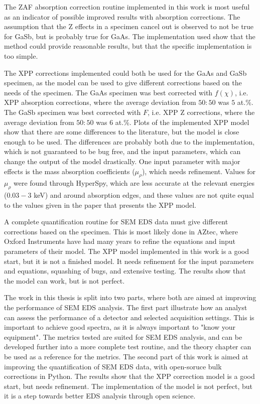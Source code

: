The ZAF absorption correction routine implemented in this work is most useful as an indicator of possible improved results with absorption corrections.
The assumption that the Z effects in a specimen cancel out is observed to not be true for GaSb, but is probably true for GaAs.
The implementation used show that the method could provide reasonable results, but that the specific implementation is too simple.

The XPP corrections implemented could both be used for the GaAs and GaSb specimen, as the model can be used to give different corrections based on the needs of the specimen.
The GaAs specimen was best corrected with $f(\chi)$, i.e. XPP absorption corrections, where the average deviation from $50:50$ was $5$ at.\%.
The GaSb specimen was best corrected with $F$, i.e. XPP Z corrections, where the average deviation from $50:50$ was $6$ at.\%.
Plots of the implemented XPP model show that there are some differences to the literature, but the model is close enough to be used.
The differences are probably both due to the implementation, which is not guaranteed to be bug free, and the input parameters, which can change the output of the model drastically.
One input parameter with major effects is the mass absorption coefficients ($\mu_\rho$), which needs refinement.
Values for $\mu_\rho$ were found through HyperSpy, which are less accurate at the relevant energies ($0.03-3$ keV) and around absorption edges, and these values are not quite equal to the values given in the paper that presents the XPP model.


A complete quantification routine for SEM EDS data must give different corrections based on the specimen.
This is most likely done in AZtec, where Oxford Instruments have had many years to refine the equations and input parameters of their model.
The XPP model implemented in this work is a good start, but it is not a finished model. 
It needs refinement for the input parameters and equations, squashing of bugs, and extensive testing.
The results show that the model can work, but is not perfect.



The work in this thesis is split into two parts, where both are aimed at improving the performance of SEM EDS analysis.
The first part illustrate how an analyst can assess the performance of a detector and selected acquisition settings.
This is important to achieve good spectra, as it is always important to "know your equipment".
The metrics tested are suited for SEM EDS analysis, and can be developed further into a more complete test routine, and the theory chapter can be used as a reference for the metrics.
The second part of this work is aimed at improving the quantification of SEM EDS data, with open-soruce bulk corrections in Python.
The results show that the XPP correction model is a good start, but needs refinement.
The implementation of the model is not perfect, but it is a step towards better EDS analysis through open science.

